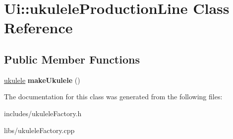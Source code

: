 \hypertarget{class_ui_1_1ukulele_production_line}{}\section{Ui\+:\+:ukulele\+Production\+Line Class Reference}
\label{class_ui_1_1ukulele_production_line}
\subsection*{Public Member Functions}
\begin{DoxyCompactItemize}
\item 
\hypertarget{class_ui_1_1ukulele_production_line_abfe0a88ab50eff266b2598c967ca74e4}{}\label{class_ui_1_1ukulele_production_line_abfe0a88ab50eff266b2598c967ca74e4} 
\hyperlink{class_ui_1_1ukulele}{ukulele} {\bfseries make\+Ukulele} ()
\end{DoxyCompactItemize}


The documentation for this class was generated from the following files\+:\begin{DoxyCompactItemize}
\item 
includes/ukulele\+Factory.\+h\item 
libs/ukulele\+Factory.\+cpp\end{DoxyCompactItemize}
